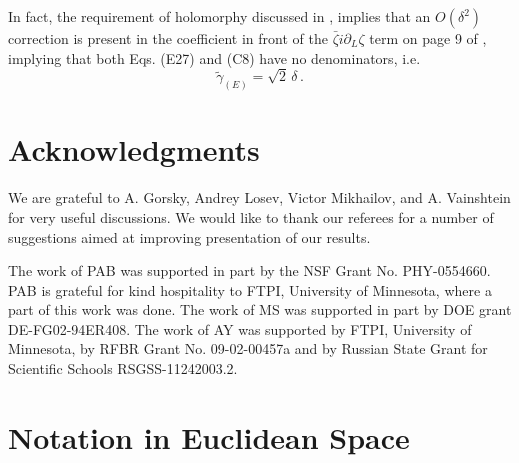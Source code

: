 \documentclass[epsfig,12pt]{article}
\def\beq{\begin{equation}}
\def\eeq{\end{equation}}
\def\beq{\begin{equation}}
\def\eeq{\end{equation}}
\begin{document}
{In fact, the requirement of holomorphy discussed in \cite{twoa}, implies that an $O(\delta^2)$ correction is present in the coefficient in front of the $\bar\zeta i\partial_L\zeta$ term on page 9 of \cite{onea}, implying that both Eqs. (E27) and (C8) have no denominators, i.e.
\beq
\tilde\gamma_{(E)} = \sqrt 2\, \delta\,.
\eeq







\section*{Acknowledgments}

We are grateful to A. Gorsky, Andrey Losev, Victor Mikhailov, and A. Vainshtein 
for very useful discussions. We would like to thank our referees for a number of suggestions aimed at improving
presentation of our results.

The work of PAB was supported in part by the NSF Grant No. PHY-0554660. 
PAB is grateful for kind hospitality to FTPI, University of Minnesota, where a part of this work was done. 
The work of MS was supported in part by DOE grant DE-FG02-94ER408. 
The work of AY was  supported 
by  FTPI, University of Minnesota, 
by RFBR Grant No. 09-02-00457a 
and by Russian State Grant for 
Scientific Schools RSGSS-11242003.2.


\newpage

\setcounter{section}{0}
\renewcommand{\thesection}{\Alph{section}}

\section{Notation in Euclidean Space}
\label{app:eucl}
%
%

\setcounter{equation}{0}

}
\end{document}
